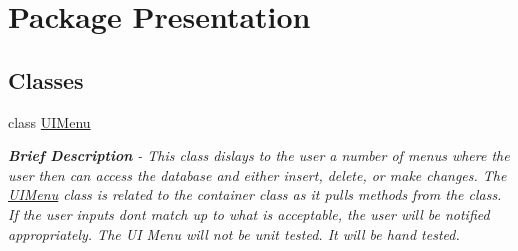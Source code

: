 \hypertarget{namespace_presentation}{}\section{Package Presentation}
\label{namespace_presentation}
\subsection*{Classes}
\begin{DoxyCompactItemize}
\item 
class \hyperlink{class_presentation_1_1_u_i_menu}{U\+I\+Menu}
\begin{DoxyCompactList}\small\item\em {\bfseries Brief Description} -\/ This class dislays to the user a number of menus where the user then can access the database and either insert, delete, or make changes. The \hyperlink{class_presentation_1_1_u_i_menu}{U\+I\+Menu} class is related to the container class as it pulls methods from the class. If the user inputs don\textquotesingle{}t match up to what is acceptable, the user will be notified appropriately. The U\+I Menu will not be unit tested. It will be hand tested. \end{DoxyCompactList}\end{DoxyCompactItemize}
